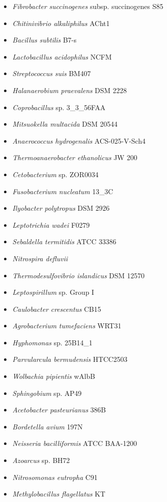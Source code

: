 \begin{itemize}
    \item \textit{Fibrobacter succinogenes} subsp. succinogenes S85
    \item \textit{Chitinivibrio alkaliphilus} ACht1
    \item \textit{Bacillus subtilis} B7-s
    \item \textit{Lactobacillus acidophilus} NCFM
    \item \textit{Streptococcus suis} BM407
    \item \textit{Halanaerobium praevalens} DSM 2228
    \item \textit{Coprobacillus} sp. 3\_3\_56FAA
    \item \textit{Mitsuokella multacida} DSM 20544
    \item \textit{Anaerococcus hydrogenalis} ACS-025-V-Sch4
    \item \textit{Thermoanaerobacter ethanolicus} JW 200
    \item \textit{Cetobacterium} sp. ZOR0034
    \item \textit{Fusobacterium nucleatum} 13\_3C
    \item \textit{Ilyobacter polytropus} DSM 2926
    \item \textit{Leptotrichia wadei} F0279
    \item \textit{Sebaldella termitidis} ATCC 33386
    \item \textit{Nitrospira defluvii}
    \item \textit{Thermodesulfovibrio islandicus} DSM 12570
    \item \textit{Leptospirillum} sp. Group I
    \item \textit{Caulobacter crescentus} CB15
    \item \textit{Agrobacterium tumefaciens} WRT31
    \item \textit{Hyphomonas} sp. 25B14\_1
    \item \textit{Parvularcula bermudensis} HTCC2503
    \item \textit{Wolbachia pipientis} wAlbB
    \item \textit{Sphingobium} sp. AP49
    \item \textit{Acetobacter pasteurianus} 386B
    \item \textit{Bordetella avium} 197N
    \item \textit{Neisseria bacilliformis} ATCC BAA-1200
    \item \textit{Azoarcus} sp. BH72
    \item \textit{Nitrosomonas eutropha} C91
    \item \textit{Methylobacillus flagellatus} KT

\end{itemize}
